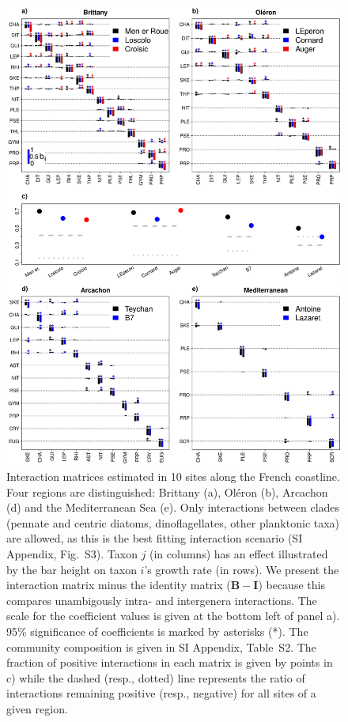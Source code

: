 \documentclass[9pt,twocolumn,twoside,lineno]{pnas-new}
\begin{document}
\begin{figure}[ht!]
\centering
 \includegraphics[width=15.8cm]{biotic_interaction_matrices_MainFig_allin1_v4}
\caption{Interaction matrices estimated in 10 sites along the French
coastline. Four regions are distinguished: Brittany (a), Oléron (b),
Arcachon (d) and the Mediterranean Sea (e). Only interactions between
clades (pennate and centric diatoms, dinoflagellates, other planktonic
taxa) are allowed, as this is the best fitting interaction scenario
(SI Appendix, Fig.~S3). Taxon $j$ (in columns) has an effect illustrated
by the bar height on taxon $i$'s growth rate (in rows). We present
the interaction matrix minus the identity matrix ($\mathbf{B}-\mathbf{I}$)
because this compares unambigously intra- and intergenera interactions.
The scale for the coefficient values is given at the bottom left of
panel a). 95\% significance of coefficients is marked by asterisks
({*}). The community composition is given in SI Appendix, Table~S2.
The fraction of positive interactions in each matrix is given by points
in c) while the dashed (resp., dotted) line represents the ratio of
interactions remaining positive (resp., negative) for all sites of
a given region.}
\label{fig:Interaction-matrices}
\end{figure}
\end{document}
